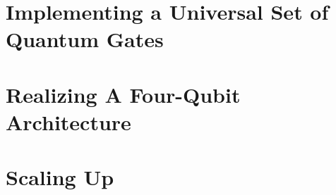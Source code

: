 \section{Implementing a Universal Set of Quantum Gates}

\section{Realizing A Four-Qubit Architecture}


\section{Scaling Up}

